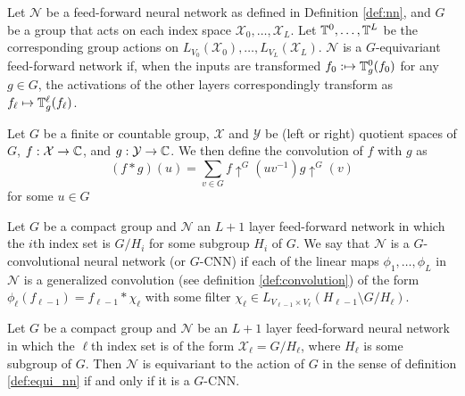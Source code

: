 \begin{definition}
	Let $\mathcal{N}$ be a feed-forward neural network as defined in Definition \ref{def:nn}, and $G$ be a group that acts on each index space $\mathcal{X}_0,\ldots,\mathcal{X}_L$.
	Let $\mathbb{T}^0,\ldots,\mathbb{T}^L$ be the corresponding group actions on $L_{V_0}(\mathcal{X}_0),\ldots,L_{V_L}(\mathcal{X}_L)$.
	$\mathcal{N}$ is a $G$-equivariant feed-forward network if, when the inputs are transformed $f_0: \mapsto \mathbb{T}_g^0(f_0)$ for any $g \in G$, the activations of the other layers correspondingly transform as $f_\ell \mapsto \mathbb{T}_g^\ell(f_{\ell})$.
\end{definition}

\begin{definition} \label{def:convolution}
	Let $G$ be a finite or countable group, $\mathcal{X}$ and $\mathcal{Y}$ be (left or right) quotient spaces of $G$, $f: \mathcal{X} \to \mathbb{C}$, and $g: \mathcal{Y} \to \mathbb{C}$.
	We then define the convolution of $f$ with $g$ as
	$$
		(f * g)(u) = \sum_{v \in G} f \uparrow^G(uv^{-1})g\uparrow^G(v)
	$$
	for some $u \in G$
\end{definition}

\begin{definition}
	Let $G$ be a compact group and $\mathcal{N}$ an $L+1$ layer feed-forward network in which the $i$th index set is $G/H_i$ for some subgroup $H_i$ of $G$.
	We say that $\mathcal{N}$ is a $G$-convolutional neural network (or $G$-CNN) if each of the linear maps $\phi_1,\ldots,\phi_L$ in $\mathcal{N}$ is a generalized convolution (see definition \ref{def:convolution}) of the form $\phi_{\ell}(f_{\ell-1}) = f_{\ell-1} * \chi_{\ell}$ with some filter $\chi_{\ell} \in L_{V_{\ell-1} \times V_{\ell}}(H_{\ell-1}\setminus G/H_{\ell})$.
\end{definition}


\begin{theorem} \label{thm:gcnn}
	Let $G$ be a compact group and $\mathcal{N}$ be an $L+1$ layer feed-forward neural network in which the $\ell$th index set is of the form $\mathcal{X}_{\ell} = G / H_{\ell}$, where $H_{\ell}$ is some subgroup of $G$.
	Then $\mathcal{N}$ is equivariant to the action of $G$ in the sense of definition \ref{def:equi_nn} if and only if it is a $G$-CNN.
\end{theorem}

